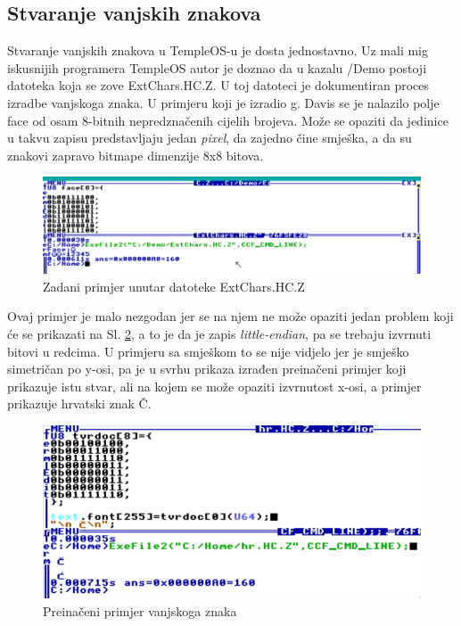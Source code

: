 \documentclass{foi}
\begin{document}
\subsection{Stvaranje vanjskih znakova\label{vanjskiZnakovi}}

Stvaranje vanjskih znakova u TempleOS-u je dosta jednostavno. Uz mali mig iskusnijih programera TempleOS autor je doznao da u kazalu {\selectfont /Demo} postoji datoteka koja se zove {\selectfont ExtChars.HC.Z}. U toj datoteci je dokumentiran proces izradbe vanjskoga znaka. U primjeru koji je izradio g. Davis se je nalazilo polje {\selectfont face} od osam 8-bitnih nepredznačenih cijelih brojeva. Može se opaziti da jedinice u takvu zapisu predstavljaju jedan \emph{pixel}, da zajedno čine smješka, a da su znakovi zapravo bitmape dimenzije 8x8 bitova.

\begin{figure}[H]
    \centering
    \includegraphics[width=1.0\textwidth]{slike/extchars1.png}
    \caption{Zadani primjer unutar datoteke {\selectfont ExtChars.HC.Z}}
    \label{fig:extchars1}
\end{figure}

Ovaj primjer je malo nezgodan jer se na njem ne može opaziti jedan problem koji će se prikazati na Sl. \ref{fig:extchars2}, a to je da je zapis \emph{little-endian}, pa se trebaju izvrnuti bitovi u redcima. U primjeru sa smješkom to se nije vidjelo jer je smješko simetričan po y-osi, pa je u svrhu prikaza izrađen preinačeni primjer koji prikazuje istu stvar, ali na kojem se može opaziti izvrnutost x-osi, a primjer prikazuje hrvatski znak {\selectfont Č}.

\begin{figure}[H]
    \centering
    \includegraphics[width=1.0\textwidth]{slike/extchars2.png}
    \caption{Preinačeni primjer vanjskoga znaka}
    \label{fig:extchars2}
\end{figure}
\end{document}
